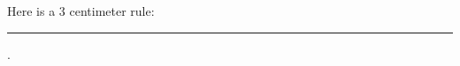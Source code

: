 \documentclass{article}
\begin{document}
Here is a 3 centimeter rule:

\noindent
\rule{3cm}{0.02cm}.
\end{document}
